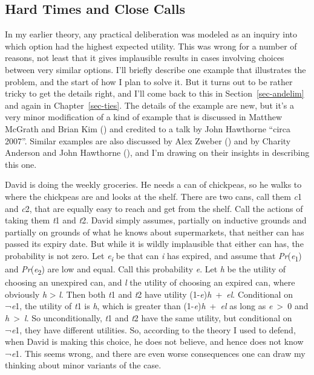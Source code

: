 \documentclass[
  12pt,
  letterpaper,
]{scrbook}
\begin{document}
\subsection{Hard Times and Close Calls}\label{sec-meties}

In my earlier theory, any practical deliberation was modeled as an
inquiry into which option had the highest expected utility. This was
wrong for a number of reasons, not least that it gives implausible
results in cases involving choices between very similar options. I'll
briefly describe one example that illustrates the problem, and the start
of how I plan to solve it. But it turns out to be rather tricky to get
the details right, and I'll come back to this in
Section~\ref{sec-andelim} and again in Chapter~\ref{sec-ties}. The
details of the example are new, but it's a very minor modification of a
kind of example that is discussed in Matthew McGrath and Brian Kim
() and credited to a talk by John
Hawthorne ``circa 2007''. Similar examples are also discussed by Alex
Zweber () and by Charity Anderson and
John Hawthorne (), and I'm
drawing on their insights in describing this one.

David is doing the weekly groceries. He needs a can of chickpeas, so he
walks to where the chickpeas are and looks at the shelf. There are two
cans, call them \emph{c}1 and \emph{c}2, that are equally easy to reach
and get from the shelf. Call the actions of taking them \emph{t}1 and
\emph{t}2. David simply assumes, partially on inductive grounds and
partially on grounds of what he knows about supermarkets, that neither
can has passed its expiry date. But while it is wildly implausible that
either can has, the probability is not zero. Let
\emph{e\textsubscript{i}} be that can \emph{i} has expired, and assume
that \emph{Pr}(\emph{e}\textsubscript{1}) and
\emph{Pr}(\emph{e}\textsubscript{2}) are low and equal. Call this
probability \emph{e}. Let \emph{h} be the utility of choosing an
unexpired can, and \emph{l} the utility of choosing an expired can,
where obviously \emph{h} \textgreater{} \emph{l}. Then both \emph{t}1
and \emph{t}2 have utility (1-\emph{e})\emph{h}~+~\emph{el}. Conditional
on ¬\emph{e}1, the utility of \emph{t}1 is \emph{h}, which is greater
than (1-\emph{e})\emph{h}~+~\emph{el} as long as \emph{e}~\textgreater~0
and \emph{h}~\textgreater~\emph{l}. So unconditionally, \emph{t}1 and
\emph{t}2 have the same utility, but conditional on ¬\emph{e}1, they
have different utilities. So, according to the theory I used to defend,
when David is making this choice, he does not believe, and hence does
not know ¬\emph{e}1. This seems wrong, and there are even worse
consequences one can draw my thinking about minor variants of the case.
\end{document}
